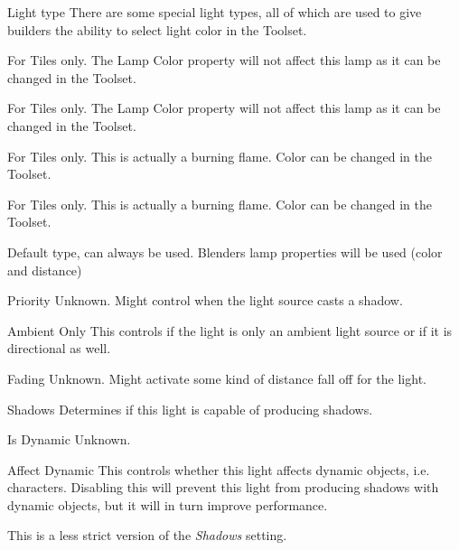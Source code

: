\begin{propertyAurora}{Light type}
There are some special light types, all of which are used to give builders
the ability to select light color in the Toolset.
\begin{description}[leftmargin=8em,style=nextline]
    \item[Mainlight 1] For Tiles only. The Lamp Color property will not affect this lamp as it can be changed in the Toolset.
    \item[Mainlight 2] For Tiles only. The Lamp Color property will not affect this lamp as it can be changed in the Toolset.
    \item[Sourcelight 1] For Tiles only. This is actually a burning flame. Color can be changed in the Toolset.
    \item[Sourcelight 2] For Tiles only. This is actually a burning flame. Color can be changed in the Toolset.
    \item[Default] Default type, can always be used. Blenders lamp properties will be used (color and distance)
\end{description}
\end{propertyAurora}

\begin{propertyAurora}{Priority}
Unknown. Might control when the light source casts a shadow.
\end{propertyAurora}

\begin{propertyAurora}{Ambient Only}
This controls if the light is only an ambient light source or
if it is directional as well.
\end{propertyAurora}

\begin{propertyAurora}{Fading}
Unknown. Might activate some kind of distance fall off for the light.
\end{propertyAurora}

\begin{propertyAurora}{Shadows}
Determines if this light is capable of producing shadows.
\end{propertyAurora}

\begin{propertyAurora}{Is Dynamic}
Unknown.
\end{propertyAurora}

\begin{propertyAurora}{Affect Dynamic}
This controls whether this light affects dynamic objects, i.e. characters.
Disabling this will prevent this light from producing shadows with dynamic
objects, but it will in turn improve performance.

This is a less strict version of the \textit{Shadows} setting.
\end{propertyAurora}

